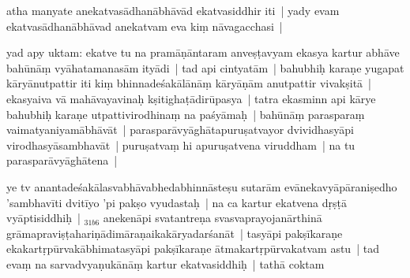 \documentclass[article,12pt,a4paper]{memoir}%
\newcounter{parCount}
\begin{document}
	  \pstart \leavevmode%
	\label{thakur75-55.27}atha manyate anekatvasādhanābhāvād ekatvasiddhir iti | yady evam ekatvasādhanābhāvad anekatvam eva kiṃ nāvagacchasi |
	{}
	\pend%
      

	  \pstart \leavevmode%
	\label{thakur75-55.29}yad apy uktam: \label{ratnakīrtinibandhāvali__36r1NSAZOF4PYRJJ9T4KL5GNBA4}ekatve tu na pramāṇāntaram anveṣṭavyam ekasya kartur abhāve bahūnāṃ vyāhatamanasām ityādi\label{ratnakīrtinibandhāvali__36r1NSAZOF6VPMT1M1P47SSA79H} | \label{ratnakīrtinibandhāvali__36r1NMN5X0PC291R8Q4FO5BKCDN}tad api cintyatām | bahubhiḥ karaṇe yugapat kāryānutpattir iti kiṃ bhinnadeśakālānāṃ kāryāṇām anutpattir vivakṣitā | ekasyaiva vā mahāvayavinaḥ kṣitighaṭādirūpasya | tatra ekasminn api kārye bahubhiḥ karaṇe utpattivirodhinaṃ na paśyāmaḥ | bahūnāṃ parasparaṃ vaimatyaniyamābhāvāt | parasparāvyāghātapuruṣatvayor dvividhasyāpi virodhasyāsambhavāt | puruṣatvaṃ hi apuruṣatvena viruddham | na tu parasparāvyāghātena |
	{}
	\pend%
      

	  \pstart \leavevmode%
	\label{thakur75-56.5}ye tv anantadeśakālasvabhāvabhedabhinnāsteṣu sutarām evānekavyāpāraniṣedho 'sambhavīti dvitīyo 'pi pakṣo vyudastaḥ | na ca kartur ekatvena dṛṣṭā vyāptisiddhiḥ | {\tiny $_{31b6}$} anekenāpi svatantreṇa svasvaprayojanārthinā grāmapraviṣṭahariṇādimāraṇaikakāryadarśanāt | tasyāpi pakṣīkaraṇe ekakartṛpūrvakābhimatasyāpi pakṣīkaraṇe ātmakartṛpūrvakatvam astu | tad evaṃ na sarvadvyaṇukānāṃ kartur ekatvasiddhiḥ | \label{ratnakīrtinibandhāvali__36r1NMMFX7IAGR5V3DIY9Q16BLF}tathā coktam
	{}
	\pend%
      
\end{document}
